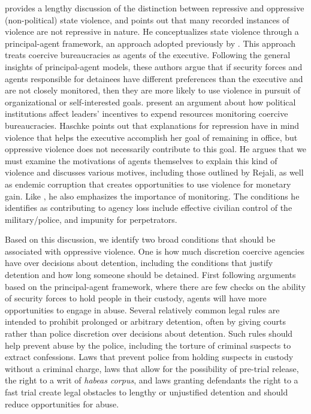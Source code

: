 \documentclass[11pt]{article}
\begin{document}
\citet{Haschke2018} provides a lengthy discussion of the distinction between repressive and oppressive (non-political) state violence, and points out that many recorded instances of violence are not repressive in nature. He conceptualizes state violence through a principal-agent framework, an approach adopted previously by \citet{ConradMoore2010}. This approach treats coercive bureaucracies as agents of the executive. Following the general insights of principal-agent models, these authors argue that if security forces and agents responsible for detainees have different preferences than the executive and are not closely monitored, then they are more likely to use violence in pursuit of organizational or self-interested goals. \citet{ConradMoore2010} present an argument about how political institutions affect leaders' incentives to expend resources monitoring coercive bureaucracies. Haschke points out that explanations for repression have in mind violence that helps the executive accomplish her goal of remaining in office, but oppressive violence does not necessarily contribute to this goal. He argues that we must examine the motivations of agents themselves to explain this kind of violence and discusses various motives, including those outlined by Rejali, as well as endemic corruption that creates opportunities to use violence for monetary gain. Like \citet{ConradMoore2010}, he also emphasizes the importance of monitoring. The conditions he identifies as contributing to agency loss include effective civilian control of the military/police, and impunity for perpetrators. 

Based on this discussion, we identify two broad conditions that should be associated with oppressive violence. One is how much discretion coercive agencies have over decisions about detention, including the conditions that justify detention and how long someone should be detained. First following arguments based on the principal-agent framework, where there are few checks on the ability of security forces to hold people in their custody, agents will have more opportunities to engage in abuse. Several relatively common legal rules are intended to prohibit prolonged or arbitrary detention, often by giving courts rather than police discretion over decisions about detention. Such rules should help prevent abuse by the police, including the torture of criminal suspects to extract confessions. Laws that prevent police from holding suspects in custody without a criminal charge, laws that allow for the possibility of pre-trial release, the right to a writ of {\em habeas corpus}, and laws granting defendants the right to a fast trial create legal obstacles to lengthy or unjustified detention and should reduce opportunities for abuse. 
\end{document}
